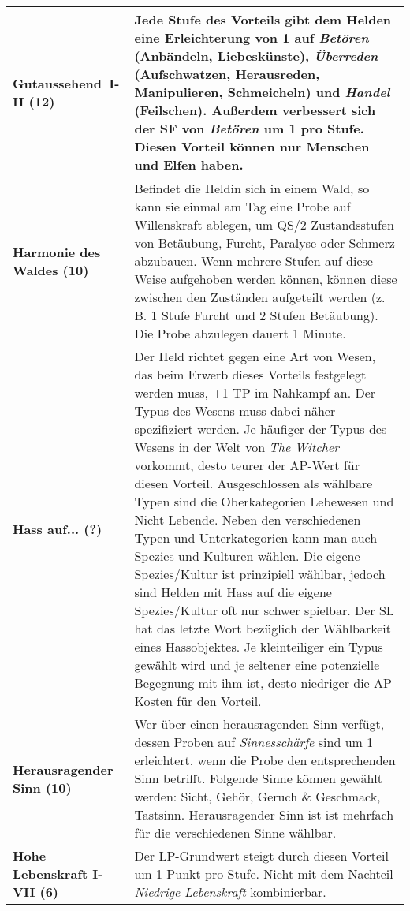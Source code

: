 \begin{longtable}{|p{5cm}|p{11cm}|}
\textbf{Gutaussehend~I-II (12)} & Jede Stufe des Vorteils gibt dem Helden eine Erleichterung von 1 auf \textit{Betören} (Anbändeln, Liebeskünste), \textit{Überreden} (Aufschwatzen, Herausreden, Manipulieren, Schmeicheln) und \textit{Handel} (Feilschen). Außerdem verbessert sich der SF von \textit{Betören} um 1 pro Stufe. Diesen Vorteil können nur Menschen und Elfen haben. \\ \hline

\textbf{Harmonie des Waldes (10)} & Befindet die Heldin sich in einem Wald, so kann sie einmal am Tag eine Probe auf Willenskraft ablegen, um QS/2 Zustandsstufen von Betäubung, Furcht, Paralyse oder Schmerz abzubauen. Wenn mehrere Stufen auf diese Weise aufgehoben werden können, können diese zwischen den Zuständen aufgeteilt werden (z. B. 1 Stufe Furcht und 2 Stufen Betäubung). Die Probe abzulegen dauert 1 Minute. \\ \hline

\textbf{Hass auf... (?)} & Der Held richtet gegen eine Art von Wesen, das beim Erwerb dieses Vorteils festgelegt werden muss, +1 TP im Nahkampf an. Der Typus des Wesens muss dabei näher spezifiziert werden. Je häufiger der Typus des Wesens in der Welt von \textit{The Witcher} vorkommt, desto teurer der AP-Wert für diesen Vorteil. Ausgeschlossen als wählbare Typen sind die Oberkategorien Lebewesen und Nicht Lebende. Neben den verschiedenen Typen und Unterkategorien kann man auch Spezies und Kulturen wählen. Die eigene Spezies/Kultur ist prinzipiell wählbar, jedoch sind Helden mit Hass auf die eigene Spezies/Kultur oft nur schwer spielbar. Der SL hat das letzte Wort bezüglich der Wählbarkeit eines Hassobjektes. Je kleinteiliger ein Typus gewählt wird und je seltener eine potenzielle Begegnung mit ihm ist, desto niedriger die AP-Kosten für den Vorteil. \\ \hline

\textbf{Herausragender Sinn (10)} & Wer über einen herausragenden Sinn verfügt, dessen Proben auf \textit{Sinnesschärfe} sind um 1 erleichtert, wenn die Probe den entsprechenden Sinn betrifft. Folgende Sinne können gewählt werden: Sicht, Gehör, Geruch \& Geschmack, Tastsinn. Herausragender Sinn ist ist mehrfach für die verschiedenen Sinne wählbar. \\ \hline

\textbf{Hohe Lebenskraft I-VII (6)} & Der LP-Grundwert steigt durch diesen Vorteil um 1 Punkt pro Stufe. Nicht mit dem Nachteil \textit{Niedrige Lebenskraft} kombinierbar. \\ \hline


\end{longtable}
